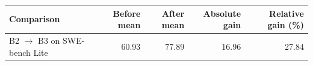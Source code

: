 \begin{tabular}{lrrrr}
\toprule
Comparison & Before mean & After mean & Absolute gain & Relative gain (\%)\\
\midrule
B2 $\rightarrow$ B3 on SWE-bench Lite & 60.93 & 77.89 & 16.96 & 27.84\\
\bottomrule
\end{tabular}